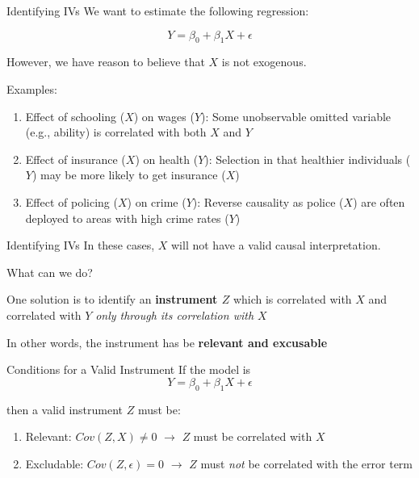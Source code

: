 \documentclass[
  ignorenonframetext,
]{beamer}
\providecommand{\tightlist}{%
  \setlength{\itemsep}{0pt}\setlength{\parskip}{0pt}}
\begin{document}
\begin{frame}{Identifying IVs}
\label{identifying-ivs}
We want to estimate the following regression:

\[ Y = \beta_{0} + \beta_{1}X + \epsilon \]

However, we have reason to believe that \(X\) is not exogenous.

Examples:

\begin{enumerate}
\tightlist
\item
  Effect of schooling (\(X\)) on wages (\(Y\)): Some unobservable
  omitted variable (e.g., ability) is correlated with both \(X\) and
  \(Y\)
\item
  Effect of insurance (\(X\)) on health (\(Y\)): Selection in that
  healthier individuals (\(Y\)) may be more likely to get insurance
  (\(X\))
\item
  Effect of policing (\(X\)) on crime (\(Y\)): Reverse causality as
  police (\(X\)) are often deployed to areas with high crime rates
  (\(Y\))
\end{enumerate}
\end{frame}

\begin{frame}{Identifying IVs}
\label{identifying-ivs-1}
In these cases, \(X\) will not have a valid causal interpretation.

What can we do?

One solution is to identify an \textbf{instrument \(Z\)} which is
correlated with \(X\) and correlated with \(Y\) \emph{only through its
correlation with \(X\)}

In other words, the instrument has be \textbf{relevant and excusable}
\end{frame}

\begin{frame}{Conditions for a Valid Instrument}
\label{conditions-for-a-valid-instrument}
If the model is \[Y = \beta_0 + \beta_1 X + \epsilon\]

then a valid instrument \(Z\) must be:

\begin{enumerate}
\tightlist
\item
  Relevant: \(Cov(Z,X) \neq 0\) \(\rightarrow\) \(Z\) must be correlated
  with \(X\)
\item
  Excludable: \(Cov(Z,\epsilon) = 0\) \(\rightarrow\) \(Z\) must
  \emph{not} be correlated with the error term
\end{enumerate}
\end{frame}
\end{document}

